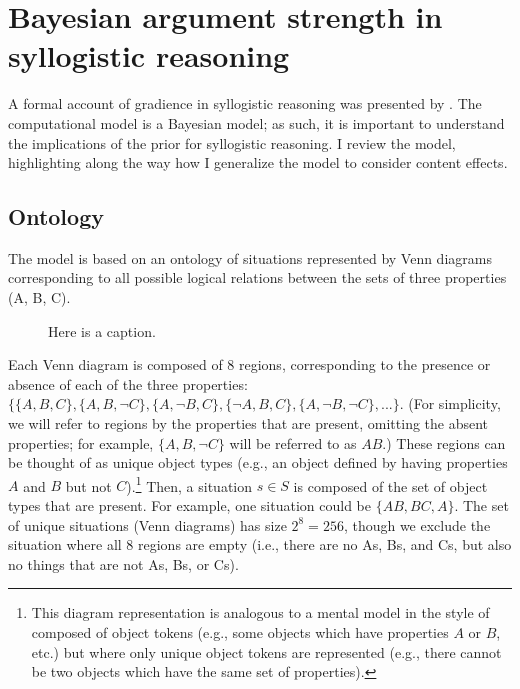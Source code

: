 \documentclass[floatsintext, man]{apa6}
\begin{document}
\section{Bayesian argument strength in syllogistic reasoning}

A formal account of gradience in syllogistic reasoning was presented by . The computational model is a Bayesian model; as such, it is important to understand the implications of the prior for syllogistic reasoning. I review the model, highlighting along the way how I generalize the model to consider content effects.

\subsection{Ontology}

The model is based on an ontology of situations represented by Venn diagrams corresponding to all possible logical relations between the sets of three properties (A, B, C). 

\begin{figure}[H]
\centering
{}
\label{fig:venn}
\caption{Here is a caption.}
\end{figure}

Each Venn diagram is composed of 8 regions, corresponding to the presence or absence of each of the three properties: $\{\{A,B,C\}, \{A,B,\neg C\}, \{A,\neg B,C\}, \{\neg A, B, C\}, \{A, \neg B, \neg C\},...\}$. (For simplicity, we will refer to regions by the properties that are present, omitting the absent properties; for example, $\{A, B, \neg C\}$ will be referred to as $AB$.)
These regions can be thought of as unique object types (e.g., an object defined by having properties $A$ and $B$ but not $C$).\footnote{This diagram representation is analogous to a mental model in the style of  composed of object tokens (e.g., some objects which have properties $A$ or $B$, etc.) but where only unique object tokens are represented (e.g., there cannot be two objects which have the same set of properties).}
Then, a situation $s \in S$ is composed of the set of object types that are present.
For example, one situation could be $\{AB, BC, A\}$.
The set of unique situations (Venn diagrams) has size $2^8 = 256$, though we exclude the situation where all 8 regions are empty (i.e., there are no As, Bs, and Cs, but also no things that are not As, Bs, or Cs).
\end{document}
